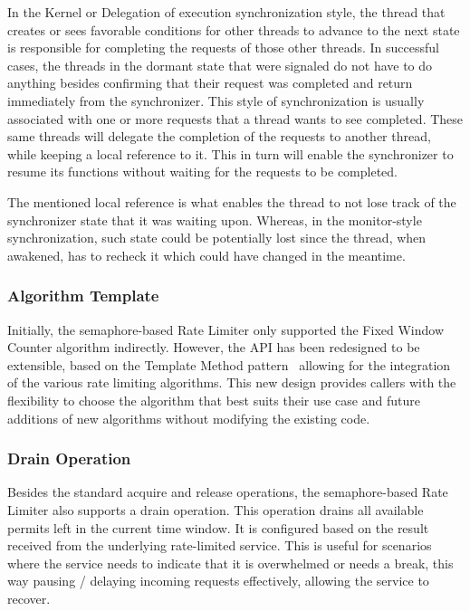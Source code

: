 In the Kernel or Delegation of execution synchronization style,
the thread that creates or sees favorable conditions for other threads to advance to the next state is responsible
for completing the requests of those other threads.
In successful cases,
the threads in the dormant state that were signaled do not have
to do anything besides confirming that their request was completed and return immediately from the synchronizer.
This style of synchronization is usually associated with one or more requests that a thread wants to see completed.
These same threads will delegate the completion of the requests to another thread,
while keeping a local reference to it.
This in turn will enable the synchronizer to resume its functions without waiting for the requests to be completed.

The mentioned local reference is what
enables the thread to not lose track of the synchronizer state that it was waiting upon.
Whereas, in the monitor-style synchronization, such state could be potentially lost since the thread,
when awakened, has to recheck it which could have changed in the meantime.

\subsubsection{Algorithm Template}\label{subsubsec:rate-limiter-algorithm-template}

Initially, the semaphore-based Rate Limiter only supported the Fixed Window Counter algorithm indirectly.
However, the API has been redesigned to be extensible, based on the Template Method pattern~\cite{design-patterns} allowing for the integration of the various rate limiting algorithms.
This new design provides callers with the flexibility to choose the algorithm that best suits their use case
and future additions of new algorithms without modifying the existing code.

\subsubsection{Drain Operation}\label{subsubsec:rate-limiter-drain-operation}

Besides the standard acquire and release operations, the semaphore-based Rate Limiter also supports a drain operation.
This operation drains all available permits left in the current time window.
It is configured based on the result received from the underlying rate-limited service.
This is useful for scenarios where the service needs to indicate that it is overwhelmed or needs a break,
this way pausing / delaying incoming requests effectively, allowing the service to recover.

